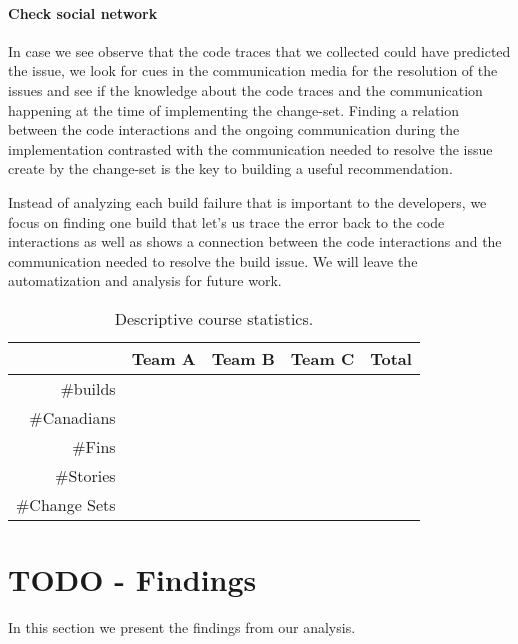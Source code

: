 \paragraph{Check social network}
In case we see observe that the code traces that we collected could have predicted the issue, we look for cues in the communication media for the resolution of the issues and see if the knowledge about the code traces and the communication happening at the time of implementing the change-set.
Finding a relation between the code interactions and the ongoing communication during the implementation contrasted with the communication needed to resolve the issue create by the change-set is the key to building a useful recommendation.

Instead of analyzing each build failure that is important to the developers, we focus on finding one build that let's us trace the error back to the code interactions as well as shows a connection between the code interactions and the communication needed to resolve the build issue.
We will leave the automatization and analysis for future work.

\begin{table}[t]
\centering
\begin{tabular}{rllll}
\toprule
& Team A & Team B & Team C & Total\\
\midrule
\#builds\\
\#Canadians\\
\#Fins\\
\#Stories\\
\#Change Sets\\
\bottomrule
\end{tabular}
\caption{Descriptive course statistics.}
\end{table}


\section{TODO - Findings}
In this section we present the findings from our analysis.

